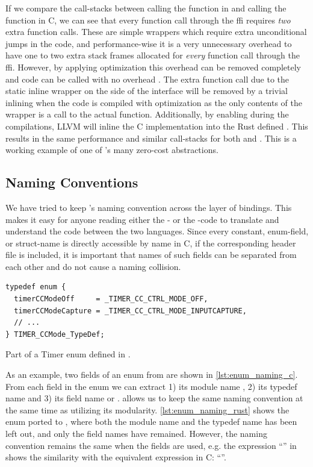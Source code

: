 If we compare the call-stacks between calling the  function in {\rust} and calling the  function in C, we can see that every function call through the \gls{ffi} requires \emph{two} extra function calls.
These are simple wrappers which require extra unconditional jumps in the code, and performance-wise it is a very unnecessary overhead to have one to two extra stack frames allocated for \emph{every} function call through the \gls{ffi}.
However, by applying optimization this overhead can be removed completely and {\C} code can be called with no overhead \cite{web:rust_once_run_everywhere}.
The extra function call due to the static inline wrapper on the {\C} side of the interface will be removed by a trivial inlining when the code is compiled with optimization as the only contents of the wrapper is a call to the actual function.
Additionally, by enabling  during the compilations, LLVM will inline the C implementation into the Rust defined .
This results in the same performance and similar call-stacks for both {\C} and {\rust}.
This is a working example of one of {\rust}'s many zero-cost abstractions.

\subsection{Naming Conventions}

We have tried to keep \emlib's naming convention across the layer of bindings.
This makes it easy for anyone reading either the {\C}- or the {\rust}-code to translate and understand the code between the two languages.
Since every constant, enum-field, or struct-name is directly accessible by name in C, if the corresponding header file is included, it is important that names of such fields can be separated from each other and do not cause a naming collision.

\begin{listing}[h]
\begin{verbatim}
typedef enum {
  timerCCModeOff     = _TIMER_CC_CTRL_MODE_OFF,
  timerCCModeCapture = _TIMER_CC_CTRL_MODE_INPUTCAPTURE,
  // ...
} TIMER_CCMode_TypeDef;
\end{verbatim}
\caption{Part of a Timer enum defined in {\C}.}
\label{lst:enum_naming_c}
\end{listing}

As an example, two fields of an enum from  are shown in \autoref{lst:enum_naming_c}.
From each field in the enum we can extract 1) its module name , 2) its typedef name  and 3) its field name  or .
{\rust} allows us to keep the same naming convention at the same time as utilizing its modularity.
\autoref{lst:enum_naming_rust} shows the enum ported to {\rust}, where both the module name and the typedef name has been left out, and only the field names have remained.
However, the naming convention remains the same when the fields are used, e.g. the expression ``'' in {\rust} shows the similarity with the equivalent expression in C: ``''.

